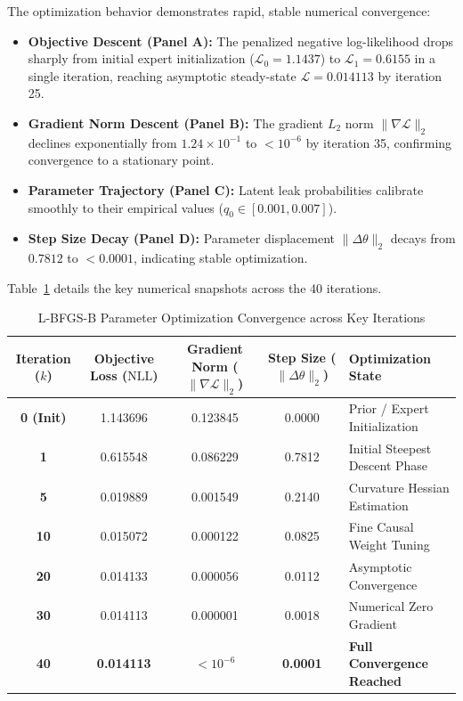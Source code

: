 \documentclass[12pt,a4paper]{report}
\begin{document}
The optimization behavior demonstrates rapid, stable numerical convergence:
\begin{itemize}
    \item \textbf{Objective Descent (Panel A):} The penalized negative log-likelihood drops sharply from initial expert initialization ($\mathcal{L}_0 = 1.1437$) to $\mathcal{L}_1 = 0.6155$ in a single iteration, reaching asymptotic steady-state $\mathcal{L} = 0.014113$ by iteration 25.
    \item \textbf{Gradient Norm Descent (Panel B):} The gradient $L_2$ norm $\|\nabla \mathcal{L}\|_2$ declines exponentially from $1.24 \times 10^{-1}$ to $< 10^{-6}$ by iteration 35, confirming convergence to a stationary point.
    \item \textbf{Parameter Trajectory (Panel C):} Latent leak probabilities calibrate smoothly to their empirical values ($q_0 \in [0.001, 0.007]$).
    \item \textbf{Step Size Decay (Panel D):} Parameter displacement $\|\Delta \theta\|_2$ decays from $0.7812$ to $< 0.0001$, indicating stable optimization.
\end{itemize}

Table~\ref{tab:bfgs_key_iters} details the key numerical snapshots across the 40 iterations.

\begin{table}[H]
\centering
\caption{L-BFGS-B Parameter Optimization Convergence across Key Iterations}
\label{tab:bfgs_key_iters}
\begin{tabular}{ccccl}
\toprule
\textbf{Iteration ($k$)} & \textbf{Objective Loss ($\text{NLL}$)} & \textbf{Gradient Norm ($\|\nabla \mathcal{L}\|_2$)} & \textbf{Step Size ($\|\Delta \theta\|_2$)} & \textbf{Optimization State} \\
\midrule
\textbf{0 (Init)} & 1.143696 & 0.123845 & 0.0000 & Prior / Expert Initialization \\
\textbf{1} & 0.615548 & 0.086229 & 0.7812 & Initial Steepest Descent Phase \\
\textbf{5} & 0.019889 & 0.001549 & 0.2140 & Curvature Hessian Estimation \\
\textbf{10} & 0.015072 & 0.000122 & 0.0825 & Fine Causal Weight Tuning \\
\textbf{20} & 0.014133 & 0.000056 & 0.0112 & Asymptotic Convergence \\
\textbf{30} & 0.014113 & 0.000001 & 0.0018 & Numerical Zero Gradient \\
\textbf{40} & \textbf{0.014113} & \textbf{$< 10^{-6}$} & \textbf{0.0001} & \textbf{Full Convergence Reached} \\
\bottomrule
\end{tabular}
\end{table}
\end{document}
